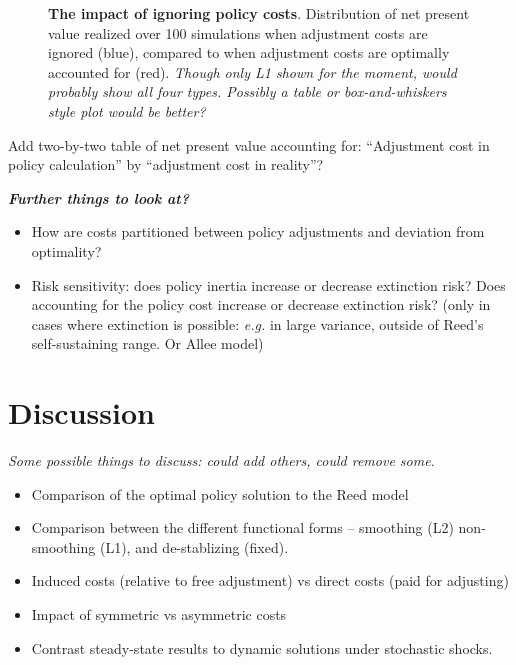 \documentclass[authoryear, review, 12pt]{elsarticle}
\newcommand{\cdb}[1]{{\it \color{darkgreen} #1}}
\begin{document}
\begin{figure}
  \begin{center}
    \caption{\textbf{The impact of ignoring policy costs}.  Distribution of net present value realized over 100 simulations when adjustment costs are ignored (blue), compared to when adjustment costs are optimally accounted for (red). \cdb{Though only L1 shown for the moment, would probably show all four types.  Possibly a table or box-and-whiskers style plot would be better?}}\label{fig:npv_dist}
  \end{center}
\end{figure}




Add two-by-two table of net present value accounting for:  ``Adjustment cost in policy calculation'' by ``adjustment cost in reality''?

\cdb{\textbf{Further things to look at?}
\begin{itemize}
  \item How are costs partitioned between policy adjustments and deviation from optimality? 
  \item Risk sensitivity: does policy inertia increase or decrease extinction risk? Does accounting for the policy cost increase or decrease extinction risk?  (only in cases where extinction is possible: \emph{e.g.} in large variance, outside of Reed's self-sustaining range.  Or Allee model)
\end{itemize}
}


\section{Discussion}
\cdb{Some possible things to discuss: could add others, could remove some.}
\begin{itemize}
\item   Comparison of the optimal policy solution to the Reed model
\item  Comparison between the different functional forms -- smoothing (L2)
  non-smoothing (L1), and de-stablizing (fixed).
\item   Induced costs (relative to free adjustment) vs direct costs (paid for adjusting) 
\item   Impact of symmetric vs asymmetric costs
\item   Contrast steady-state results to dynamic solutions under stochastic shocks.
\end{itemize}
\end{document}
